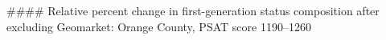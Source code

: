 #### Relative percent change in first-generation status composition after excluding Geomarket: Orange County, PSAT score 1190–1260
